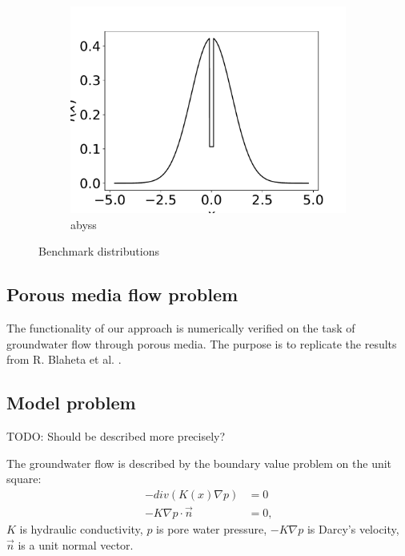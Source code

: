 \documentclass{article}
\def\todo#1{{\color{red}TODO: #1}}
\begin{document}
\begin{figure}[htb]
\begin{subfigure}{0.333\textwidth}
  \includegraphics[width=\linewidth]{benchmark_distributions/abyss.pdf}
  \caption{abyss}
  \label{fig:abyss}
\end{subfigure}
\caption{Benchmark distributions}
\label{fig:images}
\end{figure}
\FloatBarrier


\subsection{Porous media flow problem}
The functionality of our approach is numerically verified on the task of groundwater flow through porous media. The purpose is to replicate the results from R. Blaheta et al. \cite{Blaheta20160413}.

\subsection{Model problem}\label{model_problem}
\todo{Should be described more precisely?}

The groundwater flow is described by the boundary value problem on the unit square:
\begin{align}
-div(K(x)\nabla p) &= 0 \\ \nonumber
-K \nabla p  \cdot \vec{n} &= 0\text{,}
\end{align}
$K$ is hydraulic conductivity, $p$ is pore water pressure, $-K \nabla p$ is Darcy’s velocity, $\vec{n}$ is a unit normal vector.
\end{document}
